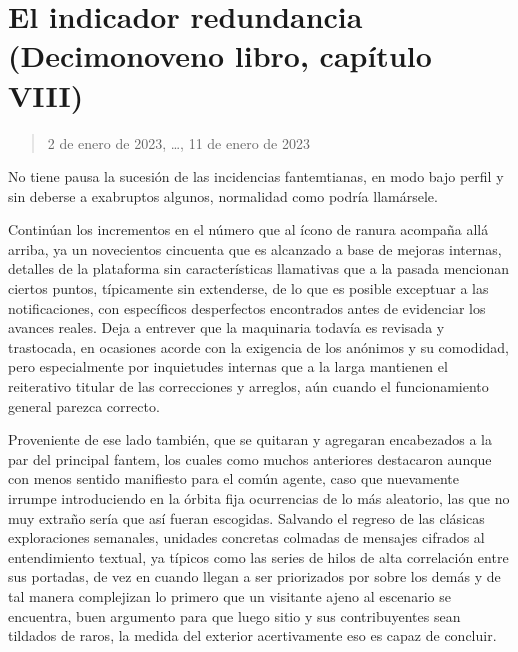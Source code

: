 \documentclass[
]{book}
\begin{document}
\hypertarget{el-indicador-redundancia-decimonoveno-libro-capuxedtulo-viii}{%
\section{El indicador redundancia (Decimonoveno libro, capítulo VIII)}\label{el-indicador-redundancia-decimonoveno-libro-capuxedtulo-viii}}

\begin{quote}
2 de enero de 2023, \ldots, 11 de enero de 2023
\end{quote}

No tiene pausa la sucesión de las incidencias fantemtianas, en modo bajo perfil y sin deberse a exabruptos algunos, normalidad como podría llamársele.

Continúan los incrementos en el número que al ícono de ranura acompaña allá arriba, ya un novecientos cincuenta que es alcanzado a base de mejoras internas, detalles de la plataforma sin características llamativas que a la pasada mencionan ciertos puntos, típicamente sin extenderse, de lo que es posible exceptuar a las notificaciones, con específicos desperfectos encontrados antes de evidenciar los avances reales. Deja a entrever que la maquinaria todavía es revisada y trastocada, en ocasiones acorde con la exigencia de los anónimos y su comodidad, pero especialmente por inquietudes internas que a la larga mantienen el reiterativo titular de las correcciones y arreglos, aún cuando el funcionamiento general parezca correcto.

Proveniente de ese lado también, que se quitaran y agregaran encabezados a la par del principal fantem, los cuales como muchos anteriores destacaron aunque con menos sentido manifiesto para el común agente, caso que nuevamente irrumpe introduciendo en la órbita fija ocurrencias de lo más aleatorio, las que no muy extraño sería que así fueran escogidas. Salvando el regreso de las clásicas exploraciones semanales, unidades concretas colmadas de mensajes cifrados al entendimiento textual, ya típicos como las series de hilos de alta correlación entre sus portadas, de vez en cuando llegan a ser priorizados por sobre los demás y de tal manera complejizan lo primero que un visitante ajeno al escenario se encuentra, buen argumento para que luego sitio y sus contribuyentes sean tildados de raros, la medida del exterior acertivamente eso es capaz de concluir.
\end{document}
